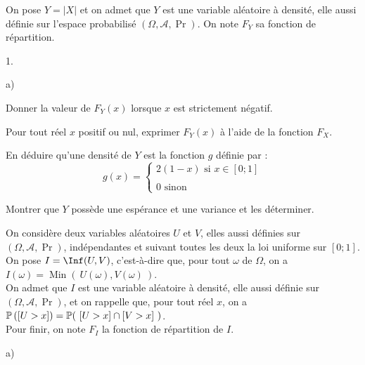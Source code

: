 \documentclass[11pt]{article}%
\begin{document}
\noindent On pose $Y = \left| X \right|$ et on admet que $Y$ est une
variable aléatoire à densité, elle aussi définie sur l'espace
probabilisé $(\Omega, \mathcal{A}, \Pr)$. On note $F_{Y}$ sa fonction
de répartition. \\

\begin{noliste}{1.}
 \setlength{\itemsep}{4mm}

\item \begin{noliste}{a)}
 \setlength{\itemsep}{2mm}

\item Donner la valeur de $F_{Y}(x)$ lorsque $x$ est strictement
négatif.

\item Pour tout réel $x$ positif ou nul, exprimer $F_{Y}(x)$ à l'aide
de la fonction $F_{X}$.

\item En déduire qu'une densité de $Y$ est la fonction $g$ définie par
: 
\[
g(x) = \left\{
\begin{array}{cl}
 2(1-x) \text{ si } x \in [ 0 ; 1] \\
\\0 \text{ sinon}
\end{array}
\right. 
\]

\item Montrer que $Y$ possède une espérance et une variance et les
déterminer. \\

\end{noliste}

\item On considère deux variables aléatoires $U$ et $V$, elles aussi
définies sur $(\Omega, \mathcal{A}, \Pr)$, indépendantes et suivant
toutes les deux la loi uniforme sur $[0 ; 1]$. \\
On pose $I = \Inf ( U,V)$, c'est-à-dire que, pour tout $\omega$ de
$\Omega$, on a $I(\omega) = \operatorname{Min}( \ U(\omega), V(\omega)
\ )$. \\
On admet que $I$ est une variable aléatoire à densité, elle aussi
définie sur $(\Omega, \mathcal{A}, \Pr)$, et on rappelle que, pour tout
réel $x$, on a $\mathbb{P}\left(\left[ {U > x} \right]\right) = \mathbb{P}( \ [U > x] \cap [
V > x ] \ )$. \\
Pour finir, on note $F_{I}$ la fonction de répartition de $I$.

\begin{noliste}{a)}
 \setlength{\itemsep}{2mm}


\end{noliste}
\end{noliste}
\end{document}
